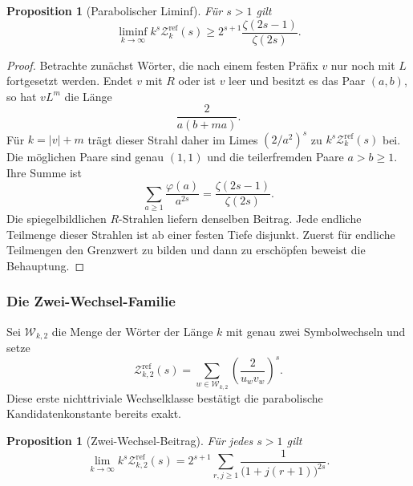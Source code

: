 \documentclass[11pt,a4paper]{article}
\newtheorem{proposition}[remark]{Proposition}
\begin{document}
\begin{proposition}[Parabolischer Liminf]
Für $s>1$ gilt
\[
 \liminf_{k\to\infty}k^s\mathcal Z_k^{\mathrm{ref}}(s)
 \ge 2^{s+1}\frac{\zeta(2s-1)}{\zeta(2s)}.
\]
\end{proposition}

\begin{proof}
Betrachte zunächst Wörter, die nach einem festen Präfix $v$ nur noch mit
$L$ fortgesetzt werden. Endet $v$ mit $R$ oder ist $v$ leer und besitzt
es das Paar $(a,b)$, so hat $vL^m$ die Länge
\[
 \frac{2}{a(b+ma)}.
\]
Für $k=|v|+m$ trägt dieser Strahl daher im Limes
$(2/a^2)^s$ zu $k^s\mathcal Z_k^{\mathrm{ref}}(s)$ bei. Die möglichen
Paare sind genau $(1,1)$ und die teilerfremden Paare $a>b\ge1$. Ihre
Summe ist
\[
 \sum_{a\ge1}\frac{\varphi(a)}{a^{2s}}
 =\frac{\zeta(2s-1)}{\zeta(2s)}.
\]
Die spiegelbildlichen $R$-Strahlen liefern denselben Beitrag. Jede
endliche Teilmenge dieser Strahlen ist ab einer festen Tiefe disjunkt.
Zuerst für endliche Teilmengen den Grenzwert zu bilden und dann zu
erschöpfen beweist die Behauptung.
\end{proof}

\subsubsection{Die Zwei-Wechsel-Familie}

Sei $\mathcal W_{k,2}$ die Menge der Wörter der Länge $k$ mit genau
zwei Symbolwechseln und setze
\[
 \mathcal Z_{k,2}^{\mathrm{ref}}(s)
 =\sum_{w\in\mathcal W_{k,2}}
 \left(\frac{2}{u_wv_w}\right)^s.
\]
Diese erste nichttriviale Wechselklasse bestätigt die parabolische
Kandidatenkonstante bereits exakt.

\begin{proposition}[Zwei-Wechsel-Beitrag]
Für jedes $s>1$ gilt
\[
 \lim_{k\to\infty}
 k^s\mathcal Z_{k,2}^{\mathrm{ref}}(s)
 =
 2^{s+1}\sum_{r,j\ge1}
 \frac{1}{\bigl(1+j(r+1)\bigr)^{2s}}.
\]
\end{proposition}
\end{document}
